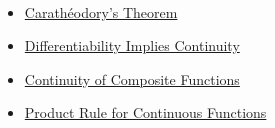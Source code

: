 \begin{remark*}[Dependencies]~\\
\begin{itemize}
  \item \hyperref[thm:caratheodory]{Carathéodory's Theorem}
  \item \hyperref[thm:diff-implies-cont]{Differentiability Implies Continuity}
  \item \hyperref[thm:continuity-composition]{Continuity of Composite Functions}
  \item \hyperref[thm:continuity-product]{Product Rule for Continuous Functions}
\end{itemize}
\end{remark*}

\clearpage
